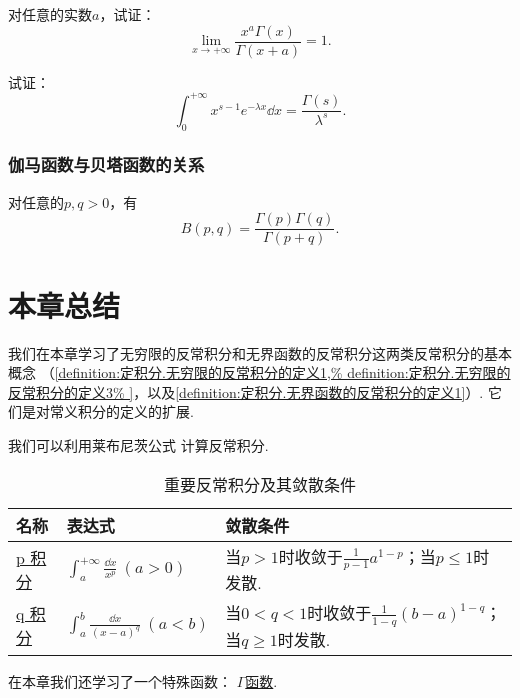 \begin{example}
对任意的实数\(a\)，试证：\[
\lim_{x\to+\infty} \frac{x^a \Gamma(x)}{\Gamma(x+a)} = 1.
\]
\end{example}

\begin{example}
试证：\begin{equation}
\int_0^{+\infty} x^{s-1} e^{-\lambda x} \dd{x}
= \frac{\Gamma(s)}{\lambda^s}.
\end{equation}
\end{example}

\subsubsection{伽马函数与贝塔函数的关系}
\begin{theorem}
对任意的\(p,q>0\)，有\begin{equation}\label{equation:定积分.伽马函数与贝塔函数的关系}
B(p,q) = \frac{\Gamma(p) \Gamma(q)}{\Gamma(p+q)}.
\end{equation}
\end{theorem}

\section{本章总结}

我们在本章学习了无穷限的反常积分和无界函数的反常积分这两类反常积分的基本概念%
（\cref{definition:定积分.无穷限的反常积分的定义1,%
definition:定积分.无穷限的反常积分的定义3%
}，以及\cref{definition:定积分.无界函数的反常积分的定义1}）.
它们是对常义积分的定义的扩展.

我们可以利用莱布尼茨公式
计算反常积分.

\begin{table}[hb]
	\centering
	\begin{tabular}{*3l}
		\hline
		名称 & 表达式 & 敛散条件 \\
		\hline
		{\hyperref[example:定积分.p积分]{p 积分}}
			& \(\int_a^{+\infty} \frac{\dd{x}}{x^p}\ (a>0)\)
			& 当\(p > 1\)时收敛于\(\frac{1}{p-1} a^{1-p}\)；当\(p \leq 1\)时发散. \\[.5cm]
		{\hyperref[example:定积分.q积分]{q 积分}}
			& \(\int_a^b \frac{\dd{x}}{(x-a)^q}\ (a<b)\)
			& 当\(0 < q < 1\)时收敛于\(\frac{1}{1-q} (b-a)^{1-q}\)；当\(q \geq 1\)时发散. \\[.5cm]
		\hline
	\end{tabular}
	\caption{重要反常积分及其敛散条件}
\end{table}

在本章我们还学习了一个特殊函数：
\hyperref[equation:特殊函数.伽马函数的积分定义]{\(\Gamma\)函数}.
